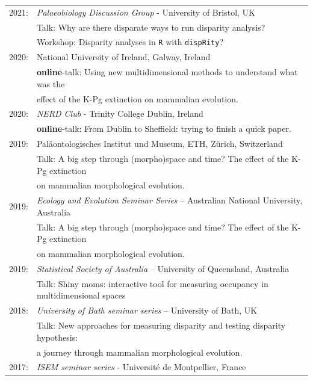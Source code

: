 \documentclass[10pt,a4paper]{article}
\begin{document}
{\begin{tabular}{ll}
2021: & \textit{Palaeobiology Discussion Group} - University of Bristol, UK\\
      & Talk: Why are there disparate ways to run disparity analysis?\\
      & Workshop: Disparity analyses in \texttt{R} with \texttt{dispRity}?\\ 
2020: & National University of Ireland, Galway, Ireland\\
      & \textbf{online}-talk: Using new multidimensional methods to understand what was the\\
      & effect of the K-Pg extinction on mammalian evolution.\\
2020: & \textit{NERD Club} - Trinity College Dublin, Ireland\\
      & \textbf{online}-talk: From Dublin to Sheffield: trying to finish a quick paper.\\
2019: & Pal\"{a}ontologisches Institut und Museum, ETH, Z\"{u}rich, Switzerland\\
      & Talk: A big step through (morpho)space and time? The effect of the K-Pg extinction\\
      & on mammalian morphological evolution.\\
2019: & \textit{Ecology and Evolution Seminar Series} – Australian National University, Australia\\
      & Talk: A big step through (morpho)space and time? The effect of the K-Pg extinction\\
      & on mammalian morphological evolution.\\
2019: & \textit{Statistical Society of Australia} – University of Queensland, Australia\\
      & Talk: Shiny moms: interactive tool for measuring occupancy in multidimensional spaces\\
2018: & \textit{University of Bath seminar series} – University of Bath, UK\\
      & Talk: New approaches for measuring disparity and testing disparity hypothesis:\\
      & a journey through mammalian morphological evolution.\\
2017: & \textit{ISEM seminar series} - Universit\'{e} de Montpellier, France\\

\end{tabular}}
\end{document}
